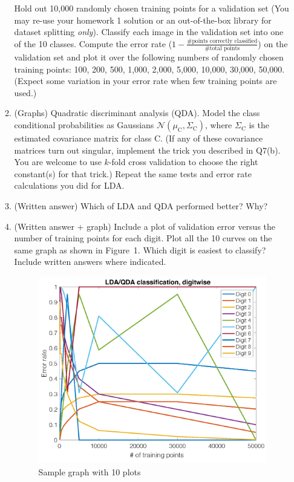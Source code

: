 \documentclass[11pt]{article}
\begin{document}
\begin{enumerate}
\begin{enumerate}
Hold out 10,000 randomly chosen training points for a validation set (You may re-use your homework 1 solution or an out-of-the-box library for dataset splitting \textit{only}).  Classify each image in the validation set into one of the 10 classes.  Compute the error rate ($1 - \frac{\text{\# points correctly classified}}{\text{\# total points}}$) on the validation set and plot it over the following numbers of randomly chosen training points:  100, 200, 500, 1,000, 2,000, 5,000, 10,000, 30,000, 50,000.  (Expect some variation in your error rate when few training points are used.)

\item (Graphs) Quadratic discriminant analysis (QDA).  Model the class conditional probabilities as Gaussians $\mathcal{N}(\mu_\mathrm{C}, \Sigma_\mathrm{C})$,  where $\Sigma_\mathrm{C}$ is the estimated covariance matrix for class C.  (If any of these covariance matrices turn out singular, implement the trick you described in Q7(b).  You are welcome to use $k$-fold cross validation to choose the right constant(s) for that trick.)  Repeat the same tests and error rate calculations you did for LDA.

\item (Written answer)  Which of LDA and QDA performed better?  Why?

\item
(Written answer + graph) Include a plot of validation error versus the number of training points for each digit. Plot all the 10 curves on the same graph as shown in Figure~1. Which digit is easiest to classify? Include written answers where indicated.

\begin{figure}[h]
\centering
\includegraphics[width=100mm]{HWfig73d.png}
\caption{ \label{fig:epsart} Sample graph with 10 plots}
\end{figure}


\end{enumerate}
\end{enumerate}
\end{document}
